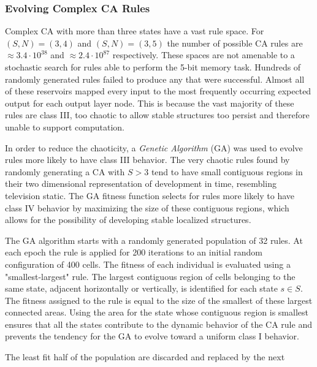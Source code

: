 \documentclass{elsarticle}
\begin{document}
\begin{multicols}{2}
  \subsubsection{Evolving Complex CA Rules}
Complex CA with more than three states have a vast rule space. For $(S,N) = 
   (3,4)$ and $(S,N) = (3,5)$ the number of possible CA rules are $\approx 3.4 
   \cdot 10^{38}$ and $\approx 2.4 \cdot 10^{87}$ respectively. These spaces 
   are not amenable to a stochastic search for rules able to perform the 5-bit 
   memory task.  Hundreds of randomly generated rules failed to produce any 
   that were successful. Almost all of these reservoirs mapped every input to 
   the most frequently occurring expected output for each output layer node.  
   This is because the vast majority of these rules are class III, too chaotic 
   to allow stable structures too persist and therefore unable to support 
   computation.\par
In order to reduce the chaoticity, a \textit{Genetic Algorithm} (GA) was used 
to evolve rules more likely to have class III behavior. The very chaotic rules 
found by randomly generating a CA with $S > 3$ tend to have small contiguous 
regions in their two dimensional representation of development in time, 
        resembling television static.  The GA fitness function selects for 
           rules more likely to have class IV behavior by maximizing the size 
           of these contiguous regions, which allows for the possibility of 
           developing stable localized structures. \par The GA algorithm starts 
           with a randomly generated population of 32 rules. At each epoch the 
           rule is applied for 200 iterations to an initial random 
           configuration of 400 cells.  The fitness of each individual is 
           evaluated using a "smallest-largest" rule.  The largest contiguous 
           region of cells belonging to the same state, adjacent horizontally 
           or vertically, is identified for each state $s \in S$. The fitness 
           assigned to the rule is equal to the size of the smallest of these 
           largest connected areas. Using the area for the state whose 
           contiguous region is smallest ensures that all the states contribute 
           to the dynamic behavior of the CA rule and prevents the tendency for 
           the GA to evolve toward a uniform class I behavior.  \par The least 
           fit half of the population are discarded and replaced by the next 

\end{multicols}
\end{document}
